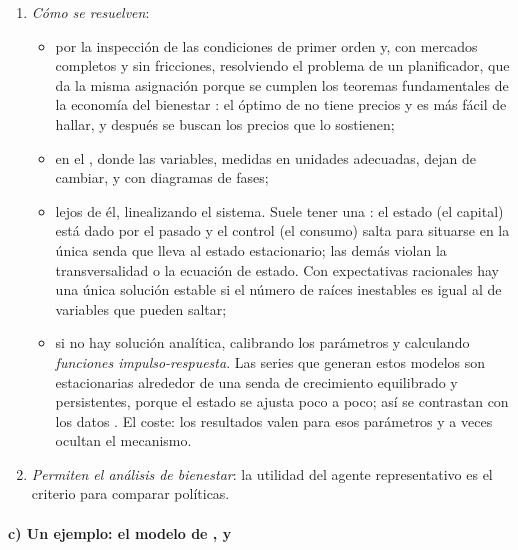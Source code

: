\documentclass[11pt]{article}
\begin{document}
\begin{enumerate}
\begin{itemize}
  \item Aunque los hogares descuenten de forma exponencial, un gobierno que se enfrenta a agentes que miran al futuro puede tener planes óptimos inconsistentes, porque sus anuncios de hoy cambian las expectativas: es la inconsistencia temporal de la política económica\nocite{KydlandPrescott1977Rules} .
  \end{itemize}
\item \emph{Cómo se resuelven}:
  \begin{itemize}
  \item por la inspección de las condiciones de primer orden y, con mercados completos y sin fricciones, resolviendo el problema de un planificador, que da la misma asignación porque se cumplen los teoremas fundamentales de la economía del bienestar : el óptimo de  no tiene precios y es más fácil de hallar, y después se buscan los precios que lo sostienen;
  \item en el , donde las variables, medidas en unidades adecuadas, dejan de cambiar, y con diagramas de fases;
  \item lejos de él, linealizando el sistema. Suele tener una : el estado (el capital) está dado por el pasado y el control (el consumo) salta para situarse en la única senda que lleva al estado estacionario; las demás violan la transversalidad o la ecuación de estado. Con expectativas racionales hay una única solución estable si el número de raíces inestables es igual al de variables que pueden saltar\nocite{BlanchardKahn1980Solution};
  \item si no hay solución analítica, calibrando los parámetros y calculando \emph{funciones impulso-respuesta}. Las series que generan estos modelos son estacionarias alrededor de una senda de crecimiento equilibrado y persistentes, porque el estado se ajusta poco a poco; así se contrastan con los datos . El coste: los resultados valen para esos parámetros y a veces ocultan el mecanismo.
  \end{itemize}
\item \emph{Permiten el análisis de bienestar}: la utilidad del agente representativo es el criterio para comparar políticas.
\end{enumerate}

\paragraph{c) Un ejemplo: el modelo de ,  y }
\end{document}
